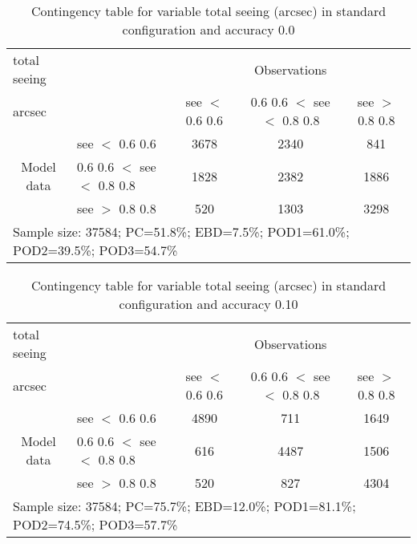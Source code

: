 \documentclass[11pt,english]{article}
\begin{document}
\newpage

\clearpage
\begin{table}[]
\begin{center}
\begin{tabular}{llccc}
\hline
{total seeing}                                       &                                                    & \multicolumn{3}{c}{Observations}                 \\
{arcsec}                                       &                             & see $<$ 0.6
0.6   & 0.6
0.6 $<$ see $<$ 0.8
0.8 & see $>$ 0.8
0.8 \\
\hline
\multicolumn{1}{c}{\multirow{3}{*}{Model data}}  & see $<$ 0.6
0.6             & 3678                & 2340                       & 841              \\
                                                 & 0.6
0.6  $<$ see $<$ 0.8
0.8 & 1828                & 2382                       & 1886              \\
                                                 & see $>$ 0.8
0.8             & 520                & 1303                       & 3298              \\
\hline
\multicolumn{5}{l}{Sample size: 37584; PC=51.8\%; EBD=7.5\%; POD1=61.0\%; POD2=39.5\%; POD3=54.7\%}
\end{tabular}
\end{center}
\caption{Contingency table for variable total seeing (arcsec) in standard configuration and accuracy 0.0}
\label{tab:contingencyseeBEF}
\end{table}
\begin{table}[]
\begin{center}
\begin{tabular}{llccc}
\hline
{total seeing}                                       &                                                    & \multicolumn{3}{c}{Observations}                 \\
{arcsec}                                       &                             & see $<$ 0.6
0.6   & 0.6
0.6 $<$ see $<$ 0.8
0.8 & see $>$ 0.8
0.8 \\
\hline
\multicolumn{1}{c}{\multirow{3}{*}{Model data}}  & see $<$ 0.6
0.6             & 4890                & 711                       & 1649              \\
                                                 & 0.6
0.6  $<$ see $<$ 0.8
0.8 & 616                & 4487                       & 1506              \\
                                                 & see $>$ 0.8
0.8             & 520                & 827                       & 4304              \\
\hline
\multicolumn{5}{l}{Sample size: 37584; PC=75.7\%; EBD=12.0\%; POD1=81.1\%; POD2=74.5\%; POD3=57.7\%}
\end{tabular}
\end{center}
\caption{Contingency table for variable total seeing (arcsec) in standard configuration and accuracy 0.10}
\label{tab:contingencyseeBEF}
\end{table}
\end{document}
